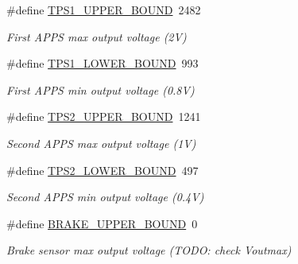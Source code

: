 \begin{DoxyCompactItemize}
\#define \mbox{\hyperlink{group___board__model__group_ga6741cba3daf129b6f73eed1b1db09519}{T\+P\+S1\+\_\+\+U\+P\+P\+E\+R\+\_\+\+B\+O\+U\+ND}}~2482
\begin{DoxyCompactList}\small\item\em First A\+P\+PS max output voltage (2V) \end{DoxyCompactList}\item 
\mbox{\label{group___board__model__group_ga9c9aa914f6b372d9ef3f15ce4108da6a}} 
\#define \mbox{\hyperlink{group___board__model__group_ga9c9aa914f6b372d9ef3f15ce4108da6a}{T\+P\+S1\+\_\+\+L\+O\+W\+E\+R\+\_\+\+B\+O\+U\+ND}}~993
\begin{DoxyCompactList}\small\item\em First A\+P\+PS min output voltage (0.\+8V) \end{DoxyCompactList}\item 
\mbox{\label{group___board__model__group_gac8be8d89c699c40b79d04c0fdf6238f4}} 
\#define \mbox{\hyperlink{group___board__model__group_gac8be8d89c699c40b79d04c0fdf6238f4}{T\+P\+S2\+\_\+\+U\+P\+P\+E\+R\+\_\+\+B\+O\+U\+ND}}~1241
\begin{DoxyCompactList}\small\item\em Second A\+P\+PS max output voltage (1V) \end{DoxyCompactList}\item 
\mbox{\label{group___board__model__group_gadfcc723e175ac44e73e38407299ac875}} 
\#define \mbox{\hyperlink{group___board__model__group_gadfcc723e175ac44e73e38407299ac875}{T\+P\+S2\+\_\+\+L\+O\+W\+E\+R\+\_\+\+B\+O\+U\+ND}}~497
\begin{DoxyCompactList}\small\item\em Second A\+P\+PS min output voltage (0.\+4V) \end{DoxyCompactList}\item 
\mbox{\label{group___board__model__group_ga891de03ab9e1bd9a92ffffe69a1b10ca}} 
\#define \mbox{\hyperlink{group___board__model__group_ga891de03ab9e1bd9a92ffffe69a1b10ca}{B\+R\+A\+K\+E\+\_\+\+U\+P\+P\+E\+R\+\_\+\+B\+O\+U\+ND}}~0
\begin{DoxyCompactList}\small\item\em Brake sensor max output voltage (T\+O\+DO\+: check Voutmax) \end{DoxyCompactList}\item 

\end{DoxyCompactItemize}
